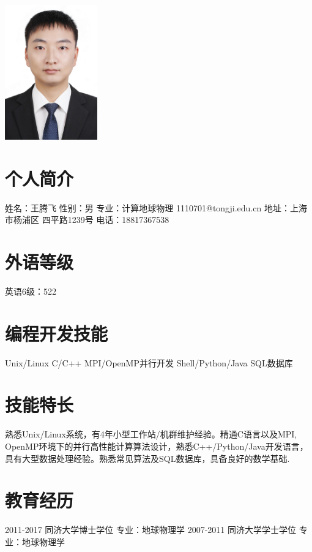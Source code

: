 \documentclass[]{friggeri-cv}
\begin{document}
       {}
\begin{aside}
\includegraphics[width=4cm]{IMG_4827small.jpg}
  \section{个人简介}
   姓名：王腾飞 
   性别：男
   专业：计算地球物理
   1110701@tongji.edu.cn
   地址：上海市杨浦区
   四平路1239号
   电话：18817367538
  \section{外语等级}
  英语6级：522
  \section{编程开发技能}
	Unix/Linux
    C/C++
	MPI/OpenMP并行开发
    Shell/Python/Java
	SQL数据库
\end{aside}

\section{技能特长}
\large
熟悉Unix/Linux系统，有4年小型工作站/机群维护经验。精通C语言以及MPI,\\
OpenMP环境下的并行高性能计算算法设计，熟悉C++/Python/Java开发语言，\\
具有大型数据处理经验。熟悉常见算法及SQL数据库，具备良好的数学基础.\\

\section{教育经历}
\begin{entrylist}
  \entryTwo
    {2011-2017}
    {同济大学博士学位 \quad 专业：地球物理学}
  \entryTwo
    {2007-2011}
    {同济大学学士学位 \quad 专业：地球物理学}
\end{entrylist}
\end{document}

